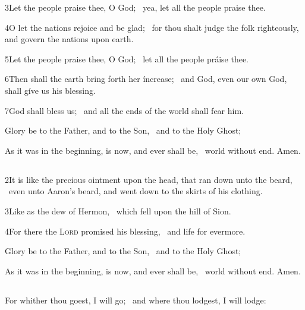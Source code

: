 3\enspace Let the people praise thee, O God; \star\ yea, let all the people praise thee.

4\enspace O let the nations rejoice and be glad; \star\ for thou shalt judge the folk righteously, and govern the nations upon earth.

5\enspace Let the people praise thee, O God; \star\ let all the people práise thee.

6\enspace Then shall the earth bring forth her íncrease; \star\ and God, even our own God, shall gíve us his blessing.

7\enspace God shall bless us; \star\ and all the ends of the world shall fear him.

Glory be to the Father, and to the Son, \star\  and to the Holy Ghost;

As it was in the beginning, is now, and ever shall be, \star\  world without end. Amen.


\medskip
\centerline{}
\subsection[{Psalm 133}]{}

2\enspace It is like the precious ointment upon the head, that ran down unto the beard, \star\ even unto Aaron’s beard, and went down to the skirts of his clothing.

3\enspace Like as the dew of Hermon, \star\ which fell upon the hill of Sion.

4\enspace For there the {\scshape Lord} promised his blessing, \star\ and life for evermore.

Glory be to the Father, and to the Son, \star\  and to the Holy Ghost;

As it was in the beginning, is now, and ever shall be, \star\  world without end. Amen.

\medskip
\centerline{}

\subsection[{The Song of Ruth}]{}

For whither thou goest, I will go; \star\ and where thou lodgest, I will lodge:

